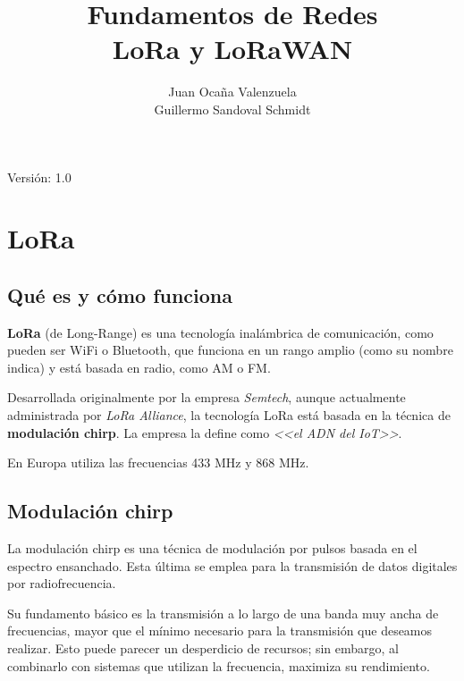 \documentclass[11pt,a4paper]{article}
\author{	Juan Ocaña Valenzuela \\ Guillermo Sandoval Schmidt }
\title{\textbf{Fundamentos de Redes} \\ 
 LoRa y LoRaWAN}
\begin{document}
\thispagestyle{empty}

\maketitle

\begin{center}

Versión: 1.0
\end{center}

\newpage

\tableofcontents

\newpage

\section{LoRa}
\subsection{Qué es y cómo funciona}
\textbf{LoRa} (de Long-Range) es una tecnología inalámbrica de comunicación, como pueden ser WiFi o Bluetooth, que funciona en un rango amplio (como su nombre indica) y está basada en radio, como AM o FM.

\medskip

Desarrollada originalmente por la empresa \textit{Semtech}, aunque actualmente administrada por \textit{LoRa Alliance}, la tecnología LoRa está basada en la técnica de \textbf{modulación chirp}. La empresa la define como \textit{<<el ADN del IoT>>}. 

\medskip

En Europa utiliza las frecuencias 433 MHz y 868 MHz.

\subsection*{Modulación chirp}
La modulación chirp es una técnica de modulación por pulsos basada en el espectro ensanchado. Esta última se emplea para la transmisión de datos digitales por radiofrecuencia.

\medskip

Su fundamento básico es la transmisión a lo largo de una banda muy ancha de frecuencias, mayor que el mínimo necesario para la transmisión que deseamos realizar. Esto puede parecer un desperdicio de recursos; sin embargo, al combinarlo con sistemas que utilizan la frecuencia, maximiza su rendimiento.

\medskip
\end{document}
